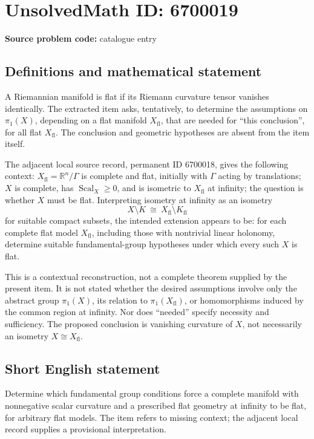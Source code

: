 \documentclass[11pt]{article}
\newcommand{\R}{\mathbb{R}}
\begin{document}
\section*{UnsolvedMath ID: 6700019}
\textbf{Source problem code:} catalogue entry
\subsection{Definitions and mathematical statement}
A Riemannian manifold is flat if its Riemann curvature tensor vanishes identically. The extracted item asks, tentatively, to determine the assumptions on \(\pi_1(X)\), depending on a flat manifold \(X_{\mathrm{fl}}\), that are needed for ``this conclusion'', for all flat \(X_{\mathrm{fl}}\). The conclusion and geometric hypotheses are absent from the item itself.

The adjacent local source record, permanent ID 6700018, gives the following context: \(X_{\mathrm{fl}}=\R^n/\Gamma\) is complete and flat, initially with \(\Gamma\) acting by translations; \(X\) is complete, has \(\operatorname{Scal}_X\geq0\), and is isometric to \(X_{\mathrm{fl}}\) at infinity; the question is whether \(X\) must be flat. Interpreting isometry at infinity as an isometry
\[
 X\setminus K\ \cong\ X_{\mathrm{fl}}\setminus K_{\mathrm{fl}}
\]
for suitable compact subsets, the intended extension appears to be: for each complete flat model \(X_{\mathrm{fl}}\), including those with nontrivial linear holonomy, determine suitable fundamental-group hypotheses under which every such \(X\) is flat.

This is a contextual reconstruction, not a complete theorem supplied by the present item. It is not stated whether the desired assumptions involve only the abstract group \(\pi_1(X)\), its relation to \(\pi_1(X_{\mathrm{fl}})\), or homomorphisms induced by the common region at infinity. Nor does ``needed'' specify necessity and sufficiency. The proposed conclusion is vanishing curvature of \(X\), not necessarily an isometry \(X\cong X_{\mathrm{fl}}\).
\subsection{Short English statement}
Determine which fundamental group conditions force a complete manifold with nonnegative scalar curvature and a prescribed flat geometry at infinity to be flat, for arbitrary flat models. The item refers to missing context; the adjacent local record supplies a provisional interpretation.
\end{document}
